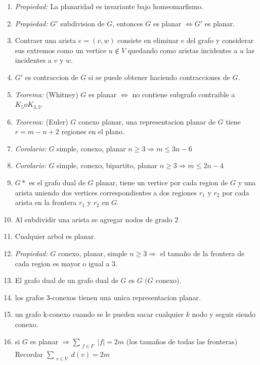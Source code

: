 \begin{enumerate}
\item \textit{Propiedad:} La planaridad es invariante bajo homeomarfismo.
\item \textit{Propiedad:} $G'$ subdivision de $G$, entonces $G$ es planar $\iff G'$ es planar.
\item Contraer una arista $e=(v,w)$ consiste en eliminar $e$ del grafo y considerar sus extremos como un vertice $u \notin V$ quedando como aristas incidentes a $u$ las incidentes a $v$ y $w$.
\item $G'$ es contraccion de $G$ si se puede obtener haciendo contracciones de $G$.
\item \textit{Teorema:} (Whitney) $G$ es planar $\iff$ no contiene subgrafo contraible a $K_{5} o K_{3,3}$.
\item \textit{Teorema:} (Euler) $G$ conexo planar, una representacion planar de $G$ tiene $r=m-n+2$ regiones en el plano.
\item \textit{Corolario:} $G$ simple, conexo, planar $n \geq 3 \Rightarrow m \leq 3n-6$
\item \textit{Corolario:} $G$ simple, conexo, bipartito, planar $n \geq 3 \Rightarrow m \leq 2n-4$
\item $G*$ es el grafo dual de $G$ planar, tiene un vertice por cada region de $G$ y una arista uniendo dos vertices correspondientes a dos regiones $r_{1}$ y $r_{2}$ por cada arista en la frontera $r_{1}$ y $r_{2}$ en $G$.
\item Al subdividir una arista se agregar nodos de grado 2
\item Cualquier arbol es planar.
\item \textit{Propiedad:} $G$ conexo, planar, simple $n \geq 3 \Rightarrow$ el tamaño de la frontera de cada region es mayor o igual a $3$.
\item El grafo dual de un grafo dual de $G$ es $G$ ($G$ conexo).
\item los grafos 3-conexos tienen una unica representacion planar.
\item un grafo k-conexo cuando se le pueden sacar cualquier $k$ nodo y seguir siendo conexo.
\item si $G$ es planar $\Rightarrow \sum_{\substack{f \in F}}|f| = 2m$ (los tamaños de todas las fronteras) Recordar $\sum_{\substack{v \in V}}d(v) = 2m$
\end{enumerate}
